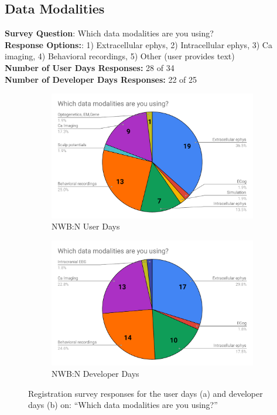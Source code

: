 \documentclass{article}
\begin{document}
\subsection{Data Modalities}
\label{sec:regsurv:datamod}

{\setlength{\parindent}{0cm}
\textbf{Survey Question}: Which data modalities are you using? \\
\textbf{Response Options:}: 1) Extracellular ephys, 2) Intracellular ephys, 3) Ca imaging, 4) Behavioral recordings, 5) Other (user provides text) \\
\textbf{Number of User Days Responses:} 28 of 34 \\ 
\textbf{Number of Developer Days Responses:} 22 of 25 
}

\begin{figure}[h!]
   \begin{subfigure}[b]{0.49\textwidth}
        \includegraphics[width=\textwidth]{figures/users_nwb_data_modality_presurvey.pdf}
        \caption{NWB:N User Days}
    \end{subfigure}
    \begin{subfigure}[b]{0.49\textwidth}
        \includegraphics[width=\textwidth]{figures/developers_nwb_data_modality_presurvey.pdf}
        \caption{NWB:N Developer Days}
    \end{subfigure}
    \caption{Registration survey responses for the user days (a) and developer days (b) on: ``Which data modalities are you using?''}
\end{figure}
\end{document}
